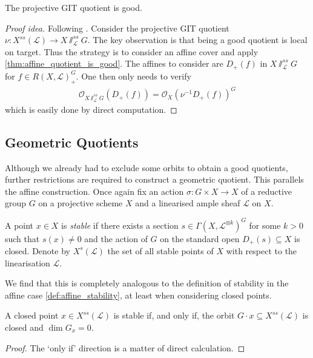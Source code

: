 \documentclass[12pt]{ociamthesis}  %
\begin{document}
\begin{theorem}
  The projective GIT quotient is good.
  \begin{proof}[Proof idea]
    Following \cite[Theorem 5.3]{hoskins2016}.
    Consider the projective GIT quotient
    $\nu : X^{ss}(\mathscr L)\to X\sslash^{ss}_{\mathscr L} G$.
    The key observation is that being a good quotient is local on target.
    Thus the strategy is to consider an affine cover and apply
    \ref{thm:affine_quotient_is_good}. The affines to consider
    are $D_+(f)$ in $X\sslash^{ss}_{\mathscr L} G$
    for $f\in R(X,\mathscr L)^G_+$. One then only needs to verify
    \begin{align*}
      \mathscr O_{X\sslash^{ss}_{\mathscr L} G}(D_+(f)) = \mathscr O_X(\nu^{-1} D_+(f))^G
    \end{align*}
    which is easily done by direct computation.
  \end{proof}
\end{theorem}

\subsection{Geometric Quotients}

Although we already had to exclude some orbits to obtain a good
quotients, further restrictions are required to construct a geometric
quotient. This parallels the affine construction.
Once again fix an action $\sigma : G\times X\to X$ of a
reductive group $G$ on a projective scheme $X$ and a linearised
ample sheaf $\mathscr L$ on $X$.

\begin{definition}
  A point $x\in X$ is \emph{stable} if there exists a section
  $s\in\Gamma(X,\mathscr L^{\otimes k})^G$ for some $k>0$ such that $s(x)\neq 0$
  and the action of $G$ on the standard open $D_+(s)\subseteq X$ is closed.
  Denote by $X^s(\mathscr L)$ the set of all stable points of $X$ with respect
  to the linearisation $\mathscr L$.
\end{definition}

We find that this is completely analogous to the definition
of stability in the affine case \ref{def:affine_stability}, at
least when considering closed points.

\begin{lemma}
  A closed point $x\in X^{ss}(\mathscr L)$ is stable if, and only if, the orbit
  $G\cdot x\subseteq X^{ss}(\mathscr L)$ is closed and $\dim G_x = 0$.
  \begin{proof}
    The `only if' direction is a matter of direct calculation.
    \missingproof
  \end{proof}
\end{lemma}
\end{document}
